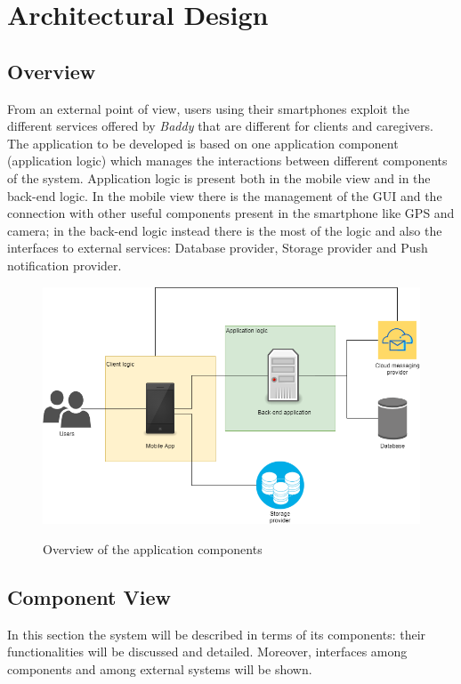 \documentclass[../../dd.tex]{subfiles}
\begin{document}
\chapter{Architectural Design}
    \section{Overview}
    From an external point of view, users using their smartphones exploit the different
    services offered by \textit{Baddy} that are different for clients and caregivers.
    The application to be developed is based on one application component (application logic) which manages the interactions
    between different components of the system.
    Application logic is present both in the mobile view and in the back-end logic.
    In the mobile view there is the management of the GUI and the connection with other useful components
    present in the smartphone like GPS and camera; in the back-end logic instead there is the most of the logic and also the interfaces to external services:
    Database provider, Storage provider and Push notification provider.
    
    
     \begin{figure}[H]
        \centering
        \includegraphics[scale=0.5]{assets/overview.png}\\[1.6 cm]
        \caption[\textit{Deployment} Diagram]{Overview of the application components}
    \end{figure}
    \section{Component View}
    In this section the system will be described in terms of its components: their
    functionalities will be discussed and detailed. Moreover, interfaces among components and among external systems will be shown.
    
\end{document}
